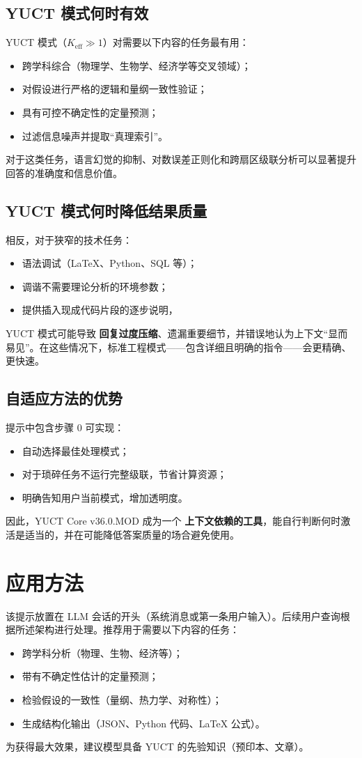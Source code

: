 \documentclass[11pt,a4paper]{article}
\begin{document}
	\subsection{YUCT 模式何时有效}
	YUCT 模式（\(K_{\mathrm{eff}} \gg 1\)）对需要以下内容的任务最有用：
	\begin{itemize}
		\item 跨学科综合（物理学、生物学、经济学等交叉领域）；
		\item 对假设进行严格的逻辑和量纲一致性验证；
		\item 具有可控不确定性的定量预测；
		\item 过滤信息噪声并提取“真理索引”。
	\end{itemize}
	对于这类任务，语言幻觉的抑制、对数误差正则化和跨扇区级联分析可以显著提升回答的准确度和信息价值。
	
	\subsection{YUCT 模式何时降低结果质量}
	相反，对于狭窄的技术任务：
	\begin{itemize}
		\item 语法调试（LaTeX、Python、SQL 等）；
		\item 调谐不需要理论分析的环境参数；
		\item 提供插入现成代码片段的逐步说明，
	\end{itemize}
	YUCT 模式可能导致 \textbf{回复过度压缩}、遗漏重要细节，并错误地认为上下文“显而易见”。在这些情况下，标准工程模式——包含详细且明确的指令——会更精确、更快速。
	
	\subsection{自适应方法的优势}
	提示中包含步骤 0 可实现：
	\begin{itemize}
		\item 自动选择最佳处理模式；
		\item 对于琐碎任务不运行完整级联，节省计算资源；
		\item 明确告知用户当前模式，增加透明度。
	\end{itemize}
	
	因此，YUCT Core v36.0.MOD 成为一个 \textbf{上下文依赖的工具}，能自行判断何时激活是适当的，并在可能降低答案质量的场合避免使用。
	
	\section{应用方法}
	该提示放置在 LLM 会话的开头（系统消息或第一条用户输入）。后续用户查询根据所述架构进行处理。推荐用于需要以下内容的任务：
	\begin{itemize}
		\item 跨学科分析（物理、生物、经济等）；
		\item 带有不确定性估计的定量预测；
		\item 检验假设的一致性（量纲、热力学、对称性）；
		\item 生成结构化输出（JSON、Python 代码、LaTeX 公式）。
	\end{itemize}
	为获得最大效果，建议模型具备 YUCT 的先验知识（预印本、文章）。
	
\end{document}

